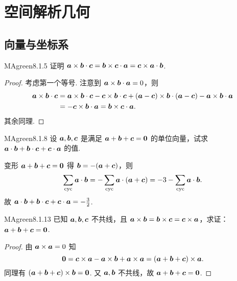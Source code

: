 \chapter{空间解析几何}

\section{向量与坐标系}

\begin{problem}{MAgreen}{8.1.5}
    证明 $\bs a \times \bs b \cdot \bs c = \bs b \times \bs c \cdot \bs a = \bs c \times \bs a \cdot \bs b$.
\end{problem}

\begin{proof}
    考虑第一个等号. 注意到 $\bs a \times \bs b \cdot \bs a = 0$，则
    \begin{align*}
        \bs a \times \bs b \cdot \bs c &= \bs a \times \bs b \cdot \bs c - \bs c \times \bs b \cdot \bs c + (\bs a - \bs c) \times \bs b \cdot (\bs a - \bs c) - \bs a \times \bs b \cdot \bs a \\
        &= -\bs c \times \bs b \cdot \bs a = \bs b \times \bs c \cdot \bs a.
    \end{align*}
    其余同理.
\end{proof}

\begin{problem}{MAgreen}{8.1.8}
    设 $\bs a, \bs b, \bs c$ 是满足 $\bs a + \bs b + \bs c = \bs 0$ 的单位向量，试求 $\bs a \cdot \bs b + \bs b \cdot \bs c + \bs c \cdot \bs a$ 的值.
\end{problem}

\begin{solution}
    变形 $\bs a + \bs b + \bs c = \bs 0$ 得 $\bs b = -(\bs a + \bs c)$，则
    \[
        \sum_{\mathrm{cyc}} \bs a \cdot \bs b = - \sum_{\mathrm{cyc}} \bs a \cdot (\bs a + \bs c) = -3 - \sum_{\mathrm{cyc}} \bs a \cdot \bs b.
    \]
    故 $\bs a \cdot \bs b + \bs b \cdot \bs c + \bs c \cdot \bs a = -\frac 3 2$.
\end{solution}

\begin{problem}{MAgreen}{8.1.13}
    已知 $\bs a, \bs b, \bs c$ 不共线，且 $\bs a \times \bs b = \bs b \times \bs c = \bs c \times \bs a$，求证：$\bs a + \bs b + \bs c = \bs 0$.
\end{problem}

\begin{proof}
    由 $\bs a \times \bs a = 0$ 知
    \[
        \bs 0 = \bs c \times \bs a - \bs a \times \bs b + \bs a \times \bs a = (\bs a + \bs b + \bs c) \times \bs a.
    \]
    同理有 $(\bs a + \bs b + \bs c) \times \bs b = \bs 0$. 又 $\bs a, \bs b$ 不共线，故 $\bs a + \bs b + \bs c = \bs 0$.
\end{proof}

